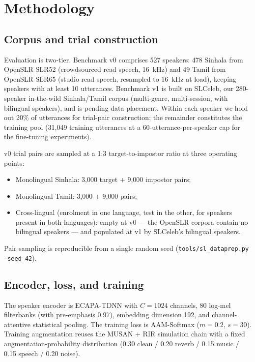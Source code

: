 \documentclass[11pt,a4paper]{article}
\begin{document}
\section{Methodology}
\label{sec:method}

\subsection{Corpus and trial construction}
\label{sec:method:corpus}

Evaluation is two-tier. Benchmark v0 comprises 527 speakers: 478
Sinhala from OpenSLR SLR52 (crowdsourced read speech, 16~kHz) and 49
Tamil from OpenSLR SLR65 (studio read speech, resampled to 16~kHz at
load), keeping speakers with at least 10 utterances. Benchmark v1 is
built on SLCeleb, our 280-speaker in-the-wild Sinhala/Tamil corpus
(multi-genre, multi-session, with bilingual speakers), and is pending
data placement. Within each speaker we hold out 20\% of utterances for
trial-pair construction; the remainder constitutes the training pool
(31{,}049 training utterances at a 60-utterance-per-speaker cap for
the fine-tuning experiments).

v0 trial pairs are sampled at a 1:3 target-to-impostor ratio at three
operating points:
\begin{itemize}
    \item Monolingual Sinhala: 3{,}000 target + 9{,}000 impostor pairs;
    \item Monolingual Tamil: 3{,}000 + 9{,}000 pairs;
    \item Cross-lingual (enrolment in one language, test in the other,
    for speakers present in both languages): empty at v0 --- the
    OpenSLR corpora contain no bilingual speakers --- and populated at
    v1 by SLCeleb's bilingual speakers.
\end{itemize}

Pair sampling is reproducible from a single random seed
(\texttt{tools/sl\_dataprep.py --seed 42}).

\subsection{Encoder, loss, and training}
\label{sec:method:encoder}

The speaker encoder is ECAPA-TDNN \cite{desplanques2020ecapa} with
$C=1024$ channels, 80 log-mel filterbanks (with pre-emphasis 0.97),
embedding dimension 192, and channel-attentive statistical pooling.
The training loss is AAM-Softmax \cite{deng2019arcface}
($m=0.2$, $s=30$). Training augmentation reuses the MUSAN + RIR
simulation chain with a fixed augmentation-probability distribution
(0.30 clean / 0.20 reverb / 0.15 music / 0.15 speech / 0.20 noise).
\end{document}
